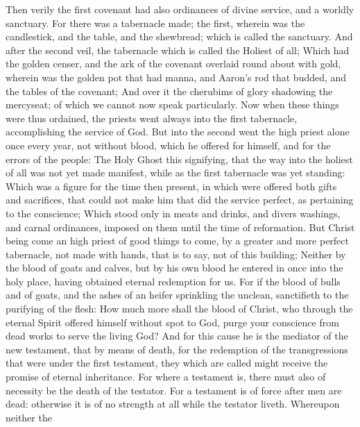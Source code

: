  Then verily the first covenant had also ordinances of
divine service, and a worldly sanctuary.  For there was a
tabernacle made; the first, wherein was the candlestick, and the table,
and the shewbread; which is called the sanctuary.  And after
the second veil, the tabernacle which is called the Holiest of all;
 Which had the golden censer, and the ark of the covenant
overlaid round about with gold, wherein was the golden pot that had
manna, and Aaron's rod that budded, and the tables of the covenant;
 And over it the cherubims of glory shadowing the mercyseat;
of which we cannot now speak particularly.  Now when these
things were thus ordained, the priests went always into the first
tabernacle, accomplishing the service of God.  But into the
second went the high priest alone once every year, not without blood,
which he offered for himself, and for the errors of the people:
 The Holy Ghost this signifying, that the way into the
holiest of all was not yet made manifest, while as the first tabernacle
was yet standing:  Which was a figure for the time then
present, in which were offered both gifts and sacrifices, that could not
make him that did the service perfect, as pertaining to the conscience;
 Which stood only in meats and drinks, and divers washings,
and carnal ordinances, imposed on them until the time of reformation.
 But Christ being come an high priest of good things to
come, by a greater and more perfect tabernacle, not made with hands,
that is to say, not of this building;  Neither by the blood
of goats and calves, but by his own blood he entered in once into the
holy place, having obtained eternal redemption for us.  For
if the blood of bulls and of goats, and the ashes of an heifer
sprinkling the unclean, sanctifieth to the purifying of the flesh:
 How much more shall the blood of Christ, who through the
eternal Spirit offered himself without spot to God, purge your
conscience from dead works to serve the living God?  And
for this cause he is the mediator of the new testament, that by means of
death, for the redemption of the transgressions that were under the
first testament, they which are called might receive the promise of
eternal inheritance.  For where a testament is, there must
also of necessity be the death of the testator.  For a
testament is of force after men are dead: otherwise it is of no strength
at all while the testator liveth.  Whereupon neither the
